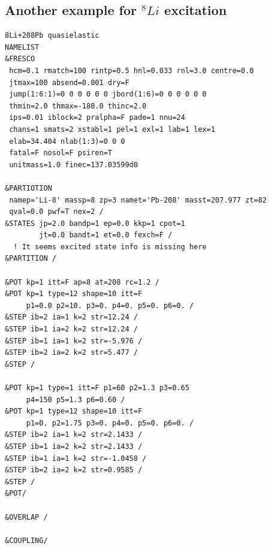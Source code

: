 \documentclass[11pt]{book}
\begin{document}
\subsection{Another example for $^8Li$ excitation}
\begin{small} 
\begin{lstlisting}[frame=single]
8Li+208Pb quasielastic
NAMELIST
&FRESCO
 hcm=0.1 rmatch=100 rintp=0.5 hnl=0.033 rnl=3.0 centre=0.0
 jtmax=100 absend=0.001 dry=F
 jump(1:6:1)=0 0 0 0 0 0 jbord(1:6)=0 0 0 0 0 0
 thmin=2.0 thmax=-180.0 thinc=2.0 
 ips=0.01 iblock=2 pralpha=F pade=1 nnu=24 
 chans=1 smats=2 xstabl=1 pel=1 exl=1 lab=1 lex=1
 elab=34.404 nlab(1:3)=0 0 0
 fatal=F nosol=F psiren=T 
 unitmass=1.0 finec=137.03599d0

&PARTIOTION
 namep='Li-8' massp=8 zp=3 namet='Pb-208' masst=207.977 zt=82
 qval=0.0 pwf=T nex=2 /
&STATES jp=2.0 bandp=1 ep=0.0 kkp=1 cpot=1
        jt=0.0 bandt=1 et=0.0 fexch=F /
  ! It seems excited state info is missing here       
&PARTITION /

&POT kp=1 itt=F ap=8 at=208 rc=1.2 /
&POT kp=1 type=12 shape=10 itt=F
     p1=0.0 p2=10. p3=0. p4=0. p5=0. p6=0. /
&STEP ib=2 ia=1 k=2 str=12.24 /            
&STEP ib=1 ia=2 k=2 str=12.24 /
&STEP ib=1 ia=1 k=2 str=-5.976 /
&STEP ib=2 ia=2 k=2 str=5.477 /
&STEP /

&POT kp=1 type=1 itt=F p1=60 p2=1.3 p3=0.65
     p4=150 p5=1.3 p6=0.60 /
&POT kp=1 type=12 shape=10 itt=F 
     p1=0. p2=1.75 p3=0. p4=0. p5=0. p6=0. /
&STEP ib=2 ia=1 k=2 str=2.1433 /
&STEP ib=1 ia=2 k=2 str=2.1433 /
&STEP ib=1 ia=1 k=2 str=-1.0458 /
&STEP ib=2 ia=2 k=2 str=0.9585 /
&STEP /
&POT/

&OVERLAP /

&COUPLING/          
\end{lstlisting}
\end{small} 
\end{document}
